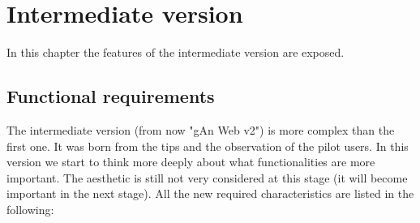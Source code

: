
\chapter{Intermediate version} %

\label{Chapter5} %

In this chapter the features of the intermediate version are exposed.

\section{Functional requirements}

The intermediate version (from now "gAn Web v2") is more complex than the first one. It was born from the tips and the observation of the pilot users. In this version we start to think more deeply about what functionalities are more important. The aesthetic is still not very considered at this stage (it will become important in the next stage). 
All the new required characteristics are listed in the following:

